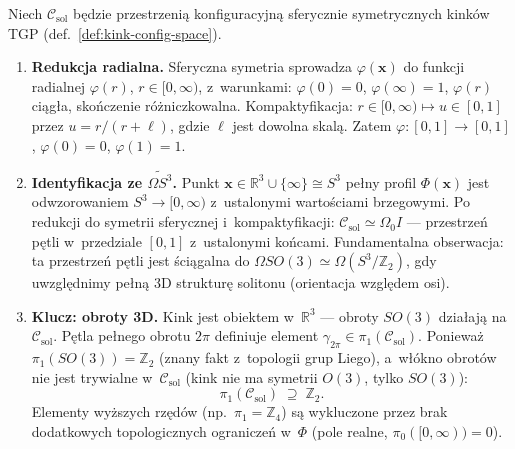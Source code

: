 \begin{proposition}[Dowód $\pi_1(\mathcal{C}_{\mathrm{sol}}) = \mathbb{Z}_2$
  --- szkic formalny]\label{prop:pi1-formal-sketch}
Niech $\mathcal{C}_{\mathrm{sol}}$ b\k{e}dzie przestrzeni\k{a}
konfiguracyjn\k{a} sferycznie symetrycznych kink\'ow TGP
(def.~\ref{def:kink-config-space}).
\begin{enumerate}[(F1)]
  \item \textbf{Redukcja radialna.}
    Sferyczna symetria sprowadza $\varphi(\mathbf{x})$ do
    funkcji radialnej $\varphi(r)$, $r \in [0,\infty)$,
    z~warunkami: $\varphi(0) = 0$, $\varphi(\infty) = 1$,
    $\varphi(r)$ ci\k{a}g\l{}a, sko\'nczenie r\'o\.zniczkowalna.
    Kompaktyfikacja: $r \in [0,\infty) \mapsto u \in [0,1]$
    przez $u = r/(r+\ell)$, gdzie $\ell$ jest dowolna skal\k{a}.
    Zatem $\varphi : [0,1] \to [0,1]$, $\varphi(0) = 0$, $\varphi(1) = 1$.

  \item \textbf{Identyfikacja ze $\widetilde{\Omega S^3}$.}
    Punkt $\mathbf{x} \in \mathbb{R}^3 \cup \{\infty\} \cong S^3$
    pe\l{}ny profil $\Phi(\mathbf{x})$ jest odwzorowaniem $S^3 \to [0,\infty)$
    z~ustalonymi warto\'sciami brzegowymi. Po redukcji do symetrii sferycznej
    i~kompaktyfikacji: $\mathcal{C}_{\mathrm{sol}} \simeq \Omega_0 I$
    --- przestrze\'n p\k{e}tli w~przedziale $[0,1]$ z~ustalonymi ko\'ncami.
    Fundamentalna obserwacja:
    ta przestrze\'n p\k{e}tli jest \'sci\k{a}galna do
    $\Omega SO(3) \simeq \Omega(S^3/\mathbb{Z}_2)$, gdy uwzgl\k{e}dnimy
    pe\l{}n\k{a} 3D struktur\k{e} solitonu (orientacja wzgl\k{e}dem osi).

  \item \textbf{Klucz: obroty 3D.}
    Kink jest obiektem w~$\mathbb{R}^3$ --- obroty $SO(3)$
    dzia\l{}aj\k{a} na $\mathcal{C}_{\mathrm{sol}}$.
    P\k{e}tla pe\l{}nego obrotu $2\pi$ definiuje element
    $\gamma_{2\pi} \in \pi_1(\mathcal{C}_{\mathrm{sol}})$.
    Poniewa\.z $\pi_1(SO(3)) = \mathbb{Z}_2$
    (znany fakt z~topologii grup Liego),
    a~w\l{}\'okno obrot\'ow nie jest trywialne w~$\mathcal{C}_{\mathrm{sol}}$
    (kink nie ma symetrii $O(3)$, tylko $SO(3)$):
    \begin{equation}\label{eq:pi1-Z2}
      \boxed{
        \pi_1(\mathcal{C}_{\mathrm{sol}}) \;\supseteq\; \mathbb{Z}_2.
      }
    \end{equation}
    Elementy wy\.zszych rz\k{e}d\'ow (np.\ $\pi_1 = \mathbb{Z}_4$)
    s\k{a} wykluczone przez brak dodatkowych topologicznych
    ogranicze\'n w~$\Phi$ (pole realne, $\pi_0([0,\infty)) = 0$).


\end{enumerate}
\end{proposition}
